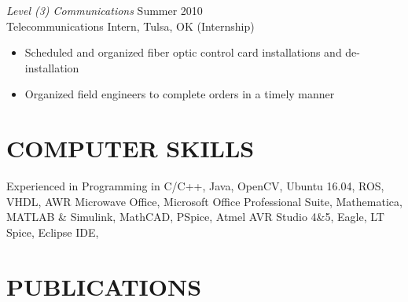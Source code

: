 \documentclass[line]{res} %
\begin{document}
\begin{resume}
{\sl Level (3) Communications} \hfill Summer 2010 \\
Telecommunications Intern, Tulsa, OK \hfill (Internship)
\begin{itemize} \itemsep -2pt %
\item Scheduled and organized fiber optic control card installations and de-installation
\item Organized field engineers to complete orders in a timely manner
\end{itemize}

\vspace{0.2in} %

\section{COMPUTER SKILLS}
\vspace{8pt} %

Experienced in Programming in C/C++, Java, OpenCV, Ubuntu 16.04, ROS, VHDL, AWR Microwave Office, Microsoft Office Professional Suite, Mathematica, MATLAB \& Simulink, MathCAD, PSpice, Atmel AVR Studio 4\&5, Eagle, LT Spice, Eclipse IDE,

\vspace{0.2in} %

\section{PUBLICATIONS} 


\end{resume}
\end{document}
